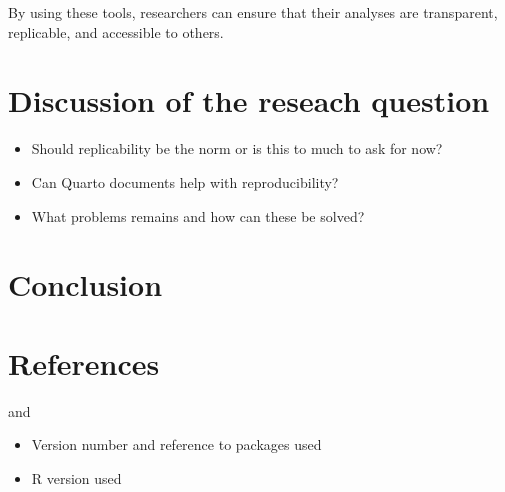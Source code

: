 \documentclass[
  british,
  a4paper,
]{article}
\providecommand{\tightlist}{%
  \setlength{\itemsep}{0pt}\setlength{\parskip}{0pt}}
\begin{document}
By using these tools, researchers can ensure that their analyses are
transparent, replicable, and accessible to others.

\section{Discussion of the reseach
question}\label{discussion-of-the-reseach-question}

\begin{itemize}
\tightlist
\item
  Should replicability be the norm or is this to much to ask for now?
\item
  Can Quarto documents help with reproducibility?
\item
  What problems remains and how can these be solved?
\end{itemize}

\section{Conclusion}\label{conclusion}

\section{References}\label{references}

and

\begin{itemize}
\tightlist
\item
  Version number and reference to packages used
\item
  R version used
\end{itemize}
\end{document}
